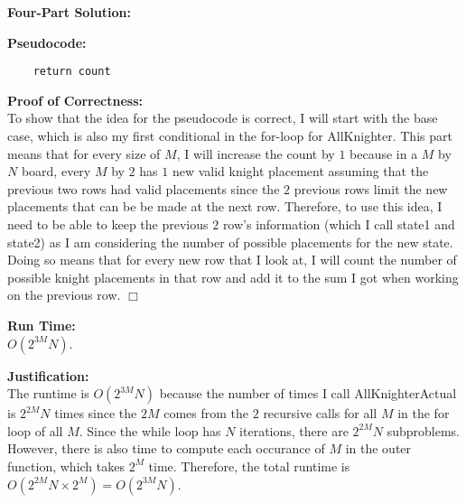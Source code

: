 \documentclass[11pt]{article}
\def\endproofmark{$\Box$}
\newenvironment{FourPartSolution}{\par{\bf Four-Part Solution:}}{\smallskip}
\newenvironment{pseudocode}{\par{\bf Pseudocode:}}{\smallskip}
\newenvironment{proofOfCorrectness}{\par{\bf Proof of Correctness:}}{\endproofmark\smallskip}
\newenvironment{runTime}{\par{\bf Run Time:}}{\smallskip}
\newenvironment{justification}{\par{\bf Justification:}}{\smallskip}
\begin{document}
\begin{FourPartSolution}
\begin{pseudocode}
\begin{lstlisting}
	return count
\end{lstlisting}
\end{pseudocode}
\begin{proofOfCorrectness}
\\
To show that the idea for the pseudocode is correct, I will start with the base case, which is also my first conditional in the for-loop for AllKnighter. This part means that for every size of $M$, I will increase the count by $1$ because in a $M$ by $N$ board, every $M$ by $2$ has $1$ new valid knight placement assuming that the previous two rows had valid placements since the $2$ previous rows limit the new placements that can be be made at the next row. Therefore, to use this idea, I need to be able to keep the previous $2$ row's information (which I call state1 and state2) as I am considering the number of possible placements for the new state. Doing so means that for every new row that I look at, I will count the number of possible knight placements in that row and add it to the sum I got when working on the previous row.
\end{proofOfCorrectness}
\\
\begin{runTime}
\\
$O(2^{3M} N)$.
\end{runTime}
\\
\begin{justification}
\\
The runtime is $O(2^{3M} N)$ because the number of times I call AllKnighterActual is $2^{2M} N$ times since the $2M$ comes from the $2$ recursive calls for all $M$ in the for loop of all $M$. Since the while loop has $N$ iterations, there are $2^{2M} N$ subproblems. However, there is also time to compute each occurance of $M$ in the outer function, which takes $2^M$ time. Therefore, the total runtime is $O(2^{2M} N \times 2^M) = O(2^{3M} N)$.
\end{justification}
\end{FourPartSolution}
\end{document}
